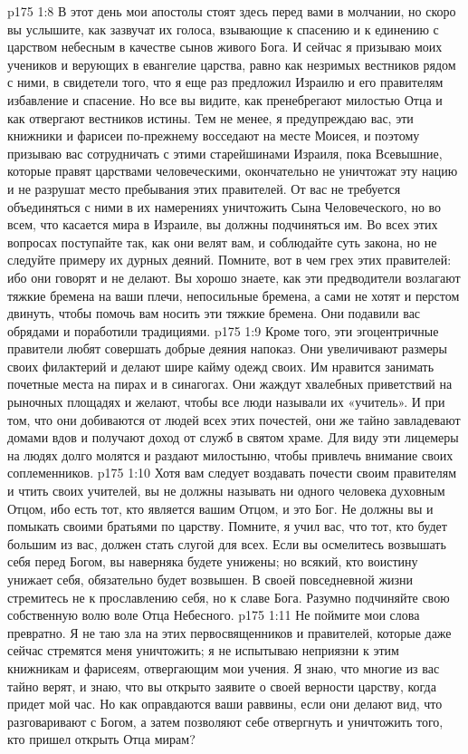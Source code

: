 \vs p175 1:8 В этот день мои апостолы стоят здесь перед вами в молчании, но скоро вы услышите, как зазвучат их голоса, взывающие к спасению и к единению с царством небесным в качестве сынов живого Бога. И сейчас я призываю моих учеников и верующих в евангелие царства, равно как незримых вестников рядом с ними, в свидетели того, что я еще раз предложил Израилю и его правителям избавление и спасение. Но все вы видите, как пренебрегают милостью Отца и как отвергают вестников истины. Тем не менее, я предупреждаю вас, эти книжники и фарисеи по\hyp{}прежнему восседают на месте Моисея, и поэтому призываю вас сотрудничать с этими старейшинами Израиля, пока Всевышние, которые правят царствами человеческими, окончательно не уничтожат эту нацию и не разрушат место пребывания этих правителей. От вас не требуется объединяться с ними в их намерениях уничтожить Сына Человеческого, но во всем, что касается мира в Израиле, вы должны подчиняться им. Во всех этих вопросах поступайте так, как они велят вам, и соблюдайте суть закона, но не следуйте примеру их дурных деяний. Помните, вот в чем грех этих правителей: ибо они говорят и не делают. Вы хорошо знаете, как эти предводители возлагают тяжкие бремена на ваши плечи, непосильные бремена, а сами не хотят и перстом двинуть, чтобы помочь вам носить эти тяжкие бремена. Они подавили вас обрядами и поработили традициями.
\vs p175 1:9 Кроме того, эти эгоцентричные правители любят совершать добрые деяния напоказ. Они увеличивают размеры своих филактерий и делают шире кайму одежд своих. Им нравится занимать почетные места на пирах и в синагогах. Они жаждут хвалебных приветствий на рыночных площадях и желают, чтобы все люди называли их «учитель». И при том, что они добиваются от людей всех этих почестей, они же тайно завладевают домами вдов и получают доход от служб в святом храме. Для виду эти лицемеры на людях долго молятся и раздают милостыню, чтобы привлечь внимание своих соплеменников.
\vs p175 1:10 Хотя вам следует воздавать почести своим правителям и чтить своих учителей, вы не должны называть ни одного человека духовным Отцом, ибо есть тот, кто является вашим Отцом, и это Бог. Не должны вы и помыкать своими братьями по царству. Помните, я учил вас, что тот, кто будет большим из вас, должен стать слугой для всех. Если вы осмелитесь возвышать себя перед Богом, вы наверняка будете унижены; но всякий, кто воистину унижает себя, обязательно будет возвышен. В своей повседневной жизни стремитесь не к прославлению себя, но к славе Бога. Разумно подчиняйте свою собственную волю воле Отца Небесного.
\vs p175 1:11 Не поймите мои слова превратно. Я не таю зла на этих первосвященников и правителей, которые даже сейчас стремятся меня уничтожить; я не испытываю неприязни к этим книжникам и фарисеям, отвергающим мои учения. Я знаю, что многие из вас тайно верят, и знаю, что вы открыто заявите о своей верности царству, когда придет мой час. Но как оправдаются ваши раввины, если они делают вид, что разговаривают с Богом, а затем позволяют себе отвергнуть и уничтожить того, кто пришел открыть Отца мирам?
